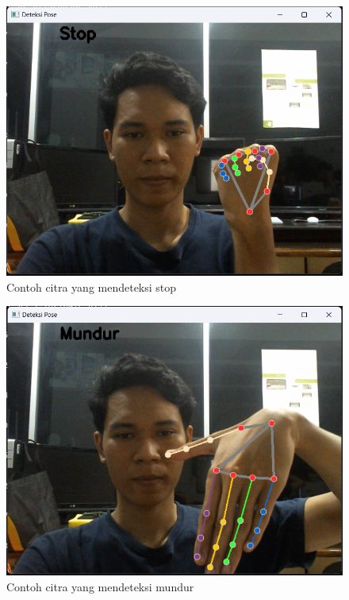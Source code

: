 \begin{figure} [h] \centering
  \includegraphics[scale=0.473]{gambar/bab3/Stop.png}
  \caption{Contoh citra yang mendeteksi stop}
  \label{fig:klasifikasi stop}
\end{figure}

\begin{figure} [!ht] \centering
  \includegraphics[scale=0.473]{gambar/bab3/Mundur.png}
  \caption{Contoh citra yang mendeteksi mundur}
  \label{fig:klasifikasi mundur}
\end{figure}

